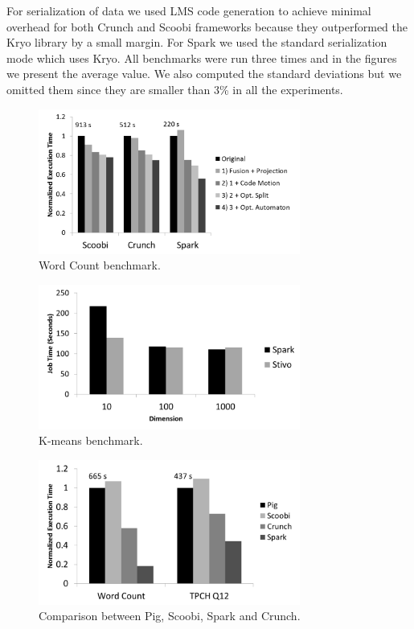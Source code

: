 For serialization of data we used LMS code generation to achieve minimal overhead for both Crunch and Scoobi frameworks because they outperformed the Kryo  library by a small margin. For Spark we used the standard serialization mode which uses Kryo. All benchmarks were run three times and in the figures we present the average value. We also computed the standard deviations but we omitted them since they are smaller than 3\% in all the experiments.


\begin{figure}[!hbt]
    \includegraphics[width=8.6cm]{figures/word-count}
   \caption{Word Count benchmark.}
   \label{fig:word-count}%
\end{figure}

\begin{figure}[!hbt]
    \includegraphics[width=8.6cm]{figures/k-means}
   \caption{K-means benchmark.}
   \label{fig:k-means}%
\end{figure}

\begin{figure}[!hbt]
    \includegraphics[width=8.6cm]{figures/pig}
   \caption{Comparison between Pig, Scoobi, Spark and Crunch.}
   \label{fig:pig}%
\end{figure}

